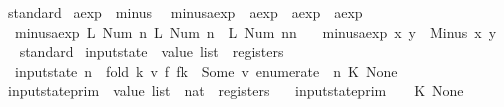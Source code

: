 \begin{isabellebody}
\isamarkupfalse%
\ standard%
\endisatagproof
{\isafoldproof}%
%
\isadelimproof
%
\endisadelimproof
\isanewline
{}\isamarkupfalse%
\isanewline
\isanewline
{}\isamarkupfalse%
\ aexp\ {\isacharcolon}{\isacharcolon}\ minus\ \isanewline
{}\isamarkupfalse%
\ minus{\isacharunderscore}aexp\ {\isacharcolon}{\isacharcolon}\ {\isachardoublequoteopen}aexp\ {\isasymRightarrow}\ aexp\ {\isasymRightarrow}\ aexp{\isachardoublequoteclose}\ \isanewline
\ \ {\isachardoublequoteopen}minus{\isacharunderscore}aexp\ {\isacharparenleft}L\ {\isacharparenleft}Num\ n{}{\isacharparenright}{\isacharparenright}\ {\isacharparenleft}L\ {\isacharparenleft}Num\ n{}{\isacharparenright}{\isacharparenright}\ {\isacharequal}\ L\ {\isacharparenleft}Num\ {\isacharparenleft}n{}{\isacharminus}n{}{\isacharparenright}{\isacharparenright}{\isachardoublequoteclose}\ {\isacharbar}\isanewline
\ \ {\isachardoublequoteopen}minus{\isacharunderscore}aexp\ x\ y\ {\isacharequal}\ Minus\ x\ y{\isachardoublequoteclose}\isanewline
\isanewline
{}\isamarkupfalse%
%
\isadelimproof
\ %
\endisadelimproof
%
\isatagproof
{}\isamarkupfalse%
\ standard%
\endisatagproof
{\isafoldproof}%
%
\isadelimproof
%
\endisadelimproof
\isanewline
{}\isamarkupfalse%
\isanewline
\isanewline
{}\isamarkupfalse%
\ input{}state\ {\isacharcolon}{\isacharcolon}\ {\isachardoublequoteopen}value\ list\ {\isasymRightarrow}\ registers{\isachardoublequoteclose}\ \isanewline
\ \ {\isachardoublequoteopen}input{}state\ n\ {\isacharequal}\ fold\ {\isacharparenleft}{\isasymlambda}{\isacharparenleft}k{\isacharcomma}\ v{\isacharparenright}\ f{\isachardot}\ f{\isacharparenleft}k\ {\isachardollar}{\isacharcolon}{\isacharequal}\ Some\ v{\isacharparenright}{\isacharparenright}\ {\isacharparenleft}enumerate\ {}\ n{\isacharparenright}\ {\isacharparenleft}K{\isachardollar}\ None{\isacharparenright}{\isachardoublequoteclose}\isanewline
\isanewline
{}\isamarkupfalse%
\ input{}state{\isacharunderscore}prim\ {\isacharcolon}{\isacharcolon}\ {\isachardoublequoteopen}value\ list\ {\isasymRightarrow}\ nat\ {\isasymRightarrow}\ registers{\isachardoublequoteclose}\ \isanewline
\ \ {\isachardoublequoteopen}input{}state{\isacharunderscore}prim\ {\isacharbrackleft}{\isacharbrackright}\ {\isacharunderscore}\ {\isacharequal}\ {\isacharparenleft}K{\isachardollar}\ None{\isacharparenright}{\isachardoublequoteclose}\ {\isacharbar}\isanewline

\end{isabellebody}
